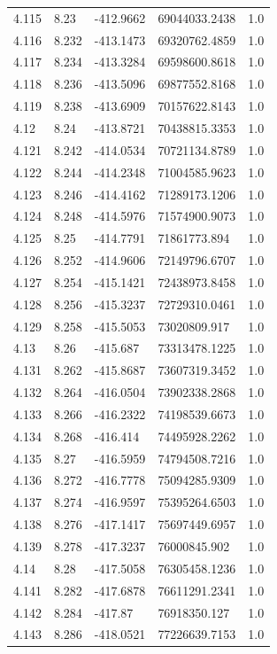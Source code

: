 \begin{tabular}{lllll}
4.115 & 8.23 & -412.9662 & 69044033.2438 & 1.0 \\
4.116 & 8.232 & -413.1473 & 69320762.4859 & 1.0 \\
4.117 & 8.234 & -413.3284 & 69598600.8618 & 1.0 \\
4.118 & 8.236 & -413.5096 & 69877552.8168 & 1.0 \\
4.119 & 8.238 & -413.6909 & 70157622.8143 & 1.0 \\
4.12 & 8.24 & -413.8721 & 70438815.3353 & 1.0 \\
4.121 & 8.242 & -414.0534 & 70721134.8789 & 1.0 \\
4.122 & 8.244 & -414.2348 & 71004585.9623 & 1.0 \\
4.123 & 8.246 & -414.4162 & 71289173.1206 & 1.0 \\
4.124 & 8.248 & -414.5976 & 71574900.9073 & 1.0 \\
4.125 & 8.25 & -414.7791 & 71861773.894 & 1.0 \\
4.126 & 8.252 & -414.9606 & 72149796.6707 & 1.0 \\
4.127 & 8.254 & -415.1421 & 72438973.8458 & 1.0 \\
4.128 & 8.256 & -415.3237 & 72729310.0461 & 1.0 \\
4.129 & 8.258 & -415.5053 & 73020809.917 & 1.0 \\
4.13 & 8.26 & -415.687 & 73313478.1225 & 1.0 \\
4.131 & 8.262 & -415.8687 & 73607319.3452 & 1.0 \\
4.132 & 8.264 & -416.0504 & 73902338.2868 & 1.0 \\
4.133 & 8.266 & -416.2322 & 74198539.6673 & 1.0 \\
4.134 & 8.268 & -416.414 & 74495928.2262 & 1.0 \\
4.135 & 8.27 & -416.5959 & 74794508.7216 & 1.0 \\
4.136 & 8.272 & -416.7778 & 75094285.9309 & 1.0 \\
4.137 & 8.274 & -416.9597 & 75395264.6503 & 1.0 \\
4.138 & 8.276 & -417.1417 & 75697449.6957 & 1.0 \\
4.139 & 8.278 & -417.3237 & 76000845.902 & 1.0 \\
4.14 & 8.28 & -417.5058 & 76305458.1236 & 1.0 \\
4.141 & 8.282 & -417.6878 & 76611291.2341 & 1.0 \\
4.142 & 8.284 & -417.87 & 76918350.127 & 1.0 \\
4.143 & 8.286 & -418.0521 & 77226639.7153 & 1.0 \\

\end{tabular}
